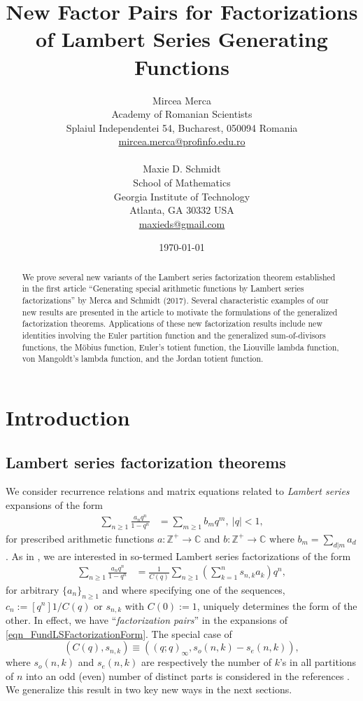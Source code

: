 \documentclass[10pt,reqno]{amsart}
\title[Lambert Series Factorizations and Factor Pairs]{
       New Factor Pairs for Factorizations of Lambert Series Generating Functions
}
\author[Mircea Merca and Maxie D. Schmidt]{
        Mircea Merca \\ 
        Academy of Romanian Scientists \\ 
        Splaiul Independentei 54, Bucharest, 050094 Romania \\ 
        \href{mailto:mircea.merca@profinfo.edu.ro}{mircea.merca@profinfo.edu.ro} \\ 
        \\ 
        Maxie D. Schmidt \\ 
        School of Mathematics \\ 
        Georgia Institute of Technology \\ 
        Atlanta, GA 30332 USA \\ 
        \href{mailto:maxieds@gmail.com}{maxieds@gmail.com}
}
\date{\today}
\numberwithin{figure}{section}
\numberwithin{table}{section}
\theoremstyle{plain}
\numberwithin{theorem}{section}
\theoremstyle{remark}
\begin{document}
 

\begin{abstract} 
We prove several new variants of the Lambert series factorization theorem 
established in the first article 
``Generating special arithmetic functions by Lambert series factorizations'' 
by Merca and Schmidt (2017). 
Several characteristic examples of our new results are presented in the article to 
motivate the formulations of the generalized factorization theorems. 
Applications of these new factorization results include new identities involving the 
Euler partition function and the generalized sum-of-divisors functions, the M\"obius function, 
Euler's totient function, the Liouville lambda function, von Mangoldt's lambda function, and the 
Jordan totient function. 
\end{abstract}

\maketitle

\section{Introduction} 

\subsection{Lambert series factorization theorems} 

We consider recurrence relations and matrix equations 
related to \emph{Lambert series} expansions of the form 
\cite[\S 27.7]{NISTHB} \cite[\S 17.10]{HARDYANDWRIGHT} 
\begin{align}
\label{eqn_LambertSeriesfb_def} 
\sum_{n \geq 1} \frac{a_n q^n}{1-q^n} & = \sum_{m \geq 1} b_m q^m,\ |q| < 1, 
\end{align} 
for prescribed arithmetic functions 
$a: \mathbb{Z}^{+} \rightarrow \mathbb{C}$ and 
$b: \mathbb{Z}^{+} \rightarrow \mathbb{C}$ where $b_m = \sum_{d | m} a_d$. 
As in \cite{MERCA-SCHMIDT1}, we are interested in so-termed Lambert series 
factorizations of the form 
\begin{align} 
\label{eqn_FundLSFactorizationForm} 
\sum_{n \geq 1} \frac{a_n q^n}{1-q^n} & = \frac{1}{C(q)} \sum_{n \geq 1} \left( 
     \sum_{k=1}^n s_{n,k} a_k\right) q^n, 
\end{align} 
for arbitrary $\{a_n\}_{n \geq 1}$ and where specifying one of the sequences, 
$c_n := [q^n] 1 / C(q)$ or $s_{n,k}$ with $C(0) := 1$, 
uniquely determines the form of the other. 
In effect, we have ``\emph{factorization pairs}'' in the 
expansions of \eqref{eqn_FundLSFactorizationForm}. 
The special case of 
\[
(C(q), s_{n,k}) \equiv \left((q; q)_{\infty}, s_o(n, k)-s_e(n, k)\right), 
\] 
where $s_o(n, k)$ and $s_e(n, k)$ are respectively the number of $k$'s in all 
partitions of $n$ into an odd (even) number of distinct parts is considered in the 
references \cite{MERCA-SCHMIDT1,MERCA-LSFACTTHM,SCHMIDT-LSFACTTHM}. 
We generalize this result in two key new ways in the next sections. 
\end{document}
